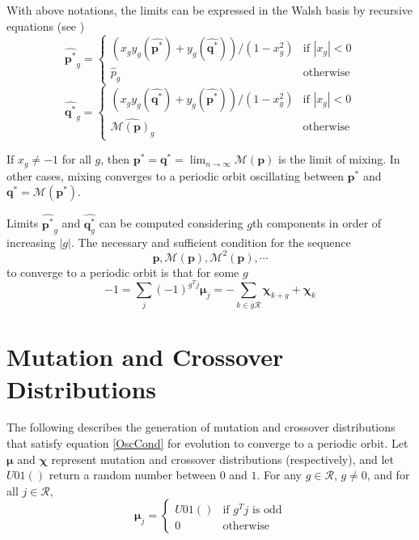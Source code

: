 With above notations, the limits can be expressed in the Walsh basis by recursive equations (see \cite{Vose1999})
\begin{equation}
\label{lt1}
\widehat{{\bm p}^{\ast}}_g  = \begin{cases}
    (x_g y_g(\widehat{{\bm p}^{\ast}}) + y_g(\widehat{{\bm q}^{\ast}}))/(1-x_g^2)  & \text{if $|x_g| < 0$}\\
    \widehat{p}_g  & \text{otherwise}
  \end{cases}
\end{equation}
\begin{equation}
\label{lt2}
\widehat{{\bm q}^{\ast}}_g  = \begin{cases}
    (x_g y_g(\widehat{{\bm q}^{\ast}}) + y_g(\widehat{{\bm p}^{\ast}}))/(1-x_g^2)  & \text{if $|x_g| < 0$}\\
    \widehat{\mathcal{M}({\bm p})_g}  & \text{otherwise}
  \end{cases}
\end{equation}

If $x_g \neq -1$ for all $g$, then ${\bm p}^\ast = {\bm q}^\ast = \lim_{n \rightarrow \infty} \mathcal{M}({\bm p})$ is the limit of mixing. In other cases, 
mixing converges to a periodic orbit oscillating between ${\bm p}^\ast$ and ${\bm q}^\ast = \mathcal{M}({\bm p}^\ast)$.

Limits $\widehat{{\bm p}^{\ast}}_g$ and $\widehat{{\bm q}^{\ast}_g}$ can be computed considering $g$th components in order of increasing $|g|$.
The necessary and sufficient condition for the sequence
\[
\bm{p}, \mathcal{M}({\bm p}), \mathcal{M}^2({\bm p}),\cdots
\]
to converge to a periodic orbit is that for some $g$
\begin{equation}
\label{OscCond}
-1 = \sum \limits_{j} (-1)^{g^T j} \bm{\mu}_j = - \sum \limits_{k \in \bar{g}\mathcal{R}} \bm{\chi}_{k+g} + \bm{\chi}_k
\end{equation}
 
\section{Mutation and Crossover Distributions}
The following describes the generation of mutation and crossover distributions that satisfy equation \ref{OscCond} 
for evolution to converge to a periodic orbit. 
Let $\bm{\mu}$ and $\bm{\chi}$ represent mutation and crossover distributions (respectively), 
and let $U01()$ return a random number between $0$ and $1$. For any $g \in \mathcal{R}$, $g \neq 0$, and for all $j \in \mathcal{R}$,
\begin{equation}
\label{MuDist}
\bm{\mu}_j = \begin{cases}
    U01() & \text{if $g^T j$ is odd}\\
    0 & \text{otherwise}
  \end{cases}
\end{equation}

